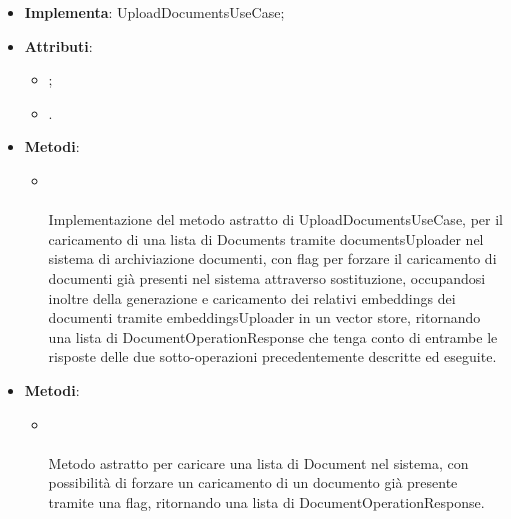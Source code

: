\documentclass[10pt, a4paper]{article}
\begin{document}
\label{UploadDocumentsServiceDettaglio}
\begin{itemize}
    \item \textbf{Implementa}: UploadDocumentsUseCase;
    \item \textbf{Attributi}:
    \begin{itemize}
        \item {};
        \item {}.  
    \end{itemize}
    \item \textbf{Metodi}:
    \begin{itemize}
        \item {}\\ \\
        Implementazione del metodo astratto di UploadDocumentsUseCase, per il caricamento di una lista di Documents tramite documentsUploader nel sistema di archiviazione documenti, con flag per forzare il caricamento di documenti già presenti nel sistema attraverso sostituzione, occupandosi inoltre della generazione e caricamento dei relativi embeddings dei documenti tramite embeddingsUploader in un vector store, ritornando una lista di DocumentOperationResponse che tenga conto di entrambe le risposte delle due sotto-operazioni precedentemente descritte ed eseguite.
    \end{itemize}
\end{itemize}


\label{UploadDocumentsUseCaseDettaglio}
\begin{itemize}
    \item \textbf{Metodi}:
    \begin{itemize}
        \item {}\\ \\
        Metodo astratto per caricare una lista di Document nel sistema, con possibilità di forzare un caricamento di un documento già presente tramite una flag, ritornando una lista di DocumentOperationResponse.
    \end{itemize}
\end{itemize}
\end{document}
